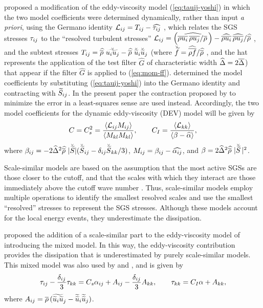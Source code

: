 \documentclass[tcfd]{svjour}
\begin{document}
\citet{moi91} proposed a modif\/ication of the
eddy-viscosity model (\ref{eq:tauij-yoshi}) in which the two model
coeff\/icients were determined dynamically, rather than input {\it a
priori}, using the Germano identity $\Lij = T_{ij} -
\widehat{\tau_{ij}}$ \citep{ger92}, which relates the SGS
stresses $\tau_{ij}$ to the ``resolved turbulent stresses''
$\Lij=\left(\widehat{\overline{\rho u_i}\,\overline{\rho
 u_j}/\rhob}\right) - \widehat{\overline{ \rho u_i }}\,
\widehat{\overline{ \rho u_j}}/\rhobh$, and the subtest stresses
$T_{ij}=\widehat{\overline{\rho}\,}\,\breve{\widetilde{u_iu_j}} - \widehat{\overline{\rho}\,}\,{\breve{\widetilde{u}}_i}{\breve{\widetilde{u}}_j}$
(where $\breve{\widetilde{f}}=\widehat{\overline{\rho f}}/\widehat{\overline{\rho}\,}\,$, and the
hat represents the application of the test f\/ilter $\widehat{{G}}$ of
characteristic width $\widehat{\Delta}=2\overline{\Delta}$)
that appear if the f\/ilter $\widehat{{G}}$ is applied to (\ref{eq:mom-ff}).
\citet{moi91} determined the model coeff\/icients by
substituting (\ref{eq:tauij-yoshi}) into the Germano identity and
contracting with $\widetilde{S}_{ij}$. In the present paper the contraction
proposed by \citet{lil92} to minimize the error in a
least-squares sense are used instead. Accordingly, the two model
coeff\/icients for the dynamic eddy-viscosity (DEV) model will be given
by
\begin{equation}
 \label{eq:coeff_dsm}
 C = C_s^2 = \frac{ \langle {\cal L}_{ij}M_{ij}\rangle }
 { \langle M_{kl}M_{kl}\rangle } , \qquad
 C_I = \frac{ \langle {\cal L}_{kk}\rangle }
 { \langle\beta-\widehat{\alpha}\rangle } ,
\end{equation}
where $\beta_{ij} = -2\widehat{\Delta}^2\widehat{\overline{\rho}\,}\,|\breve{\widetilde{S}}|
(\breve{\widetilde{S}}_{ij}-\delta_{ij}\breve{\widetilde{S}}_{kk}/3)$, $M_{ij}=\beta_{ij}-\widehat{\alpha_{ij}}$, and
$\beta=2\widehat{\Delta}^2 \widehat{\overline{\rho}\,}\,|\breve{\widetilde{S}}\,|^2$.

Scale-similar models are based on the assumption that the most active
SGSs are those closer to the cutoff, and that the scales
with which they interact are those immediately above the cutoff wave number
\citep{bar80}. Thus, scale-similar models employ
multiple operations to identify the smallest resolved scales and use
the smallest ``resolved'' stresses to represent the SGS stresses.
Although these models account for the local energy events, they
underestimate the dissipation.

\citet{spe88} proposed the addition of a scale-similar
part to the eddy-viscosity model of \citet{yos86}
introducing the mixed model. In this way, the eddy-viscosity
contribution provides the dissipation that is underestimated by purely
scale-similar models. This mixed model was also used by \citet{erl92}
and \citet{zan92}, and is given by
\begin{equation}
 \label{eq:tauij-sezhu}
 \tau_{ij} - \frac{\delta_{ij}}{3}\tau_{kk} = C_s\alpha_{ij} + A_{ij}
 - \frac{\delta_{ij}}{3} A_{kk} , \qquad
 \tau_{kk} = C_I \alpha + A_{kk},
\end{equation}
where $A_{ij}=\overline{\rho}\,(\widetilde{{\widetilde u_i}\widetilde{u}}_j-{\widetilde{\widetilde{u}}_i}{\widetilde{\widetilde{u}}_j})$.
\end{document}
